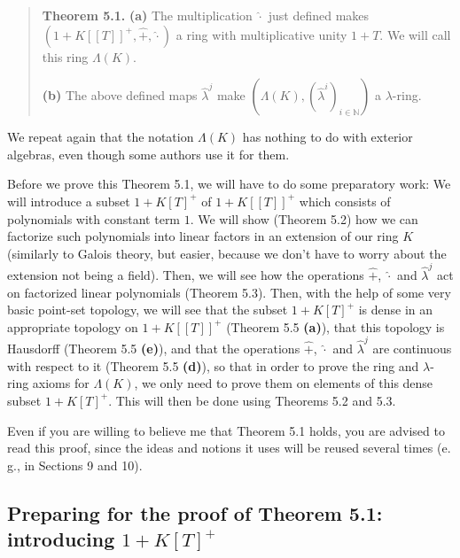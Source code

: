 \documentclass[numbers=enddot,12pt,final,onecolumn,notitlepage]{scrartcl}%
\begin{document}
\begin{quote}
\textbf{Theorem 5.1.} \textbf{(a)} The multiplication $\widehat{\cdot}$ just
defined makes $\left(  1+K\left[  \left[  T\right]  \right]  ^{+}%
,\widehat{+},\widehat{\cdot}\right)  $ a ring with multiplicative unity $1+T$.
We will call this ring $\Lambda\left(  K\right)  $.

\textbf{(b)} The above defined maps $\widehat{\lambda}^{j}$ make $\left(
\Lambda\left(  K\right)  ,\left(  \widehat{\lambda}^{i}\right)  _{i\in
\mathbb{N}}\right)  $ a $\lambda$-ring.
\end{quote}

We repeat again that the notation $\Lambda\left(  K\right)  $ has nothing to
do with exterior algebras, even though some authors use it for them.

Before we prove this Theorem 5.1, we will have to do some preparatory work: We
will introduce a subset $1+K\left[  T\right]  ^{+}$ of $1+K\left[  \left[
T\right]  \right]  ^{+}$ which consists of polynomials with constant term $1$.
We will show (Theorem 5.2) how we can factorize such polynomials into linear
factors in an extension of our ring $K$ (similarly to Galois theory, but
easier, because we don't have to worry about the extension not being a field).
Then, we will see how the operations $\widehat{+}$, $\widehat{\cdot}$ and
$\widehat{\lambda}^{j}$ act on factorized linear polynomials (Theorem 5.3).
Then, with the help of some very basic point-set topology, we will see that
the subset $1+K\left[  T\right]  ^{+}$ is dense in an appropriate topology on
$1+K\left[  \left[  T\right]  \right]  ^{+}$ (Theorem 5.5 \textbf{(a)}), that
this topology is Hausdorff (Theorem 5.5 \textbf{(e)}), and that the operations
$\widehat{+}$, $\widehat{\cdot}$ and $\widehat{\lambda}^{j}$ are continuous
with respect to it (Theorem 5.5 \textbf{(d)}), so that in order to prove the
ring and $\lambda$-ring axioms for $\Lambda\left(  K\right)  $, we only need
to prove them on elements of this dense subset $1+K\left[  T\right]  ^{+}$.
This will then be done using Theorems 5.2 and 5.3.

Even if you are willing to believe me that Theorem 5.1 holds, you are advised
to read this proof, since the ideas and notions it uses will be reused several
times (e. g., in Sections 9 and 10).

\subsection{Preparing for the proof of Theorem 5.1: introducing $1+K\left[
T\right]  ^{+}$}
\end{document}
